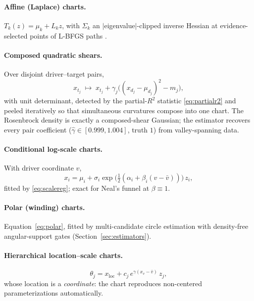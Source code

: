 \documentclass[11pt]{article}
\theoremstyle{remark}
\begin{document}
\paragraph{Affine (Laplace) charts.} $T_k(z)=\mu_k+L_kz$, with $\Sigma_k$
an $\lvert$eigenvalue$\rvert$-clipped inverse Hessian at
evidence-selected points of L-BFGS paths \citep{zhang2022,liu1989}.

\paragraph{Composed quadratic shears.} Over disjoint driver--target
pairs,
\begin{equation}
x_{t_j}\;\mapsto\;x_{t_j}
+\gamma_j\bigl((x_{d_j}-\mu_{d_j})^2-m_j\bigr),
\label{eq:shear}
\end{equation}
with unit determinant, detected by the partial-$R^2$ statistic
\eqref{eq:partialr2} and peeled iteratively so that simultaneous
curvatures compose into one chart. The Rosenbrock density is exactly a
composed-shear Gaussian; the estimator recovers every pair coefficient
($\hat\gamma\in[0.999,1.004]$, truth $1$) from valley-spanning data.

\paragraph{Conditional log-scale charts.} With driver coordinate $v$,
\begin{equation}
x_i=\mu_i+\sigma_i
\exp\!\bigl(\tfrac12(\alpha_i+\beta_i(v-\bar v))\bigr)\,z_i,
\label{eq:scalechart}
\end{equation}
fitted by \eqref{eq:scalereg}; exact for Neal's funnel \citep{neal2003}
at $\beta\equiv1$.

\paragraph{Polar (winding) charts.} Equation~\eqref{eq:polar}, fitted by
multi-candidate circle estimation with density-free angular-support gates
(Section~\ref{sec:estimators}).

\paragraph{Hierarchical location--scale charts.}
\begin{equation}
\theta_j=x_{\mathrm{loc}}+c_j\,e^{\gamma(x_v-\bar v)}\,z_j,
\label{eq:hierchart}
\end{equation}
whose location is a \emph{coordinate}: the chart reproduces non-centered
parameterizations \citep{papaspiliopoulos2007,betancourt2015}
automatically.
\end{document}
